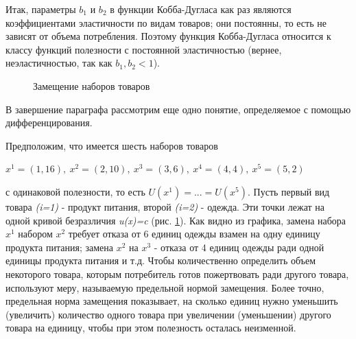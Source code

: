 \documentclass[12pt, 4paper]{book}
\begin{document}
{Итак, параметры $b_1$ и $b_2$ в функции Кобба-Дугласа как раз являются коэффициентами эластичности по видам товаров; они постоянны, то есть не зависят от объема потребления. Поэтому функция Кобба-Дугласа относится к классу функций полезности с постоянной эластичностью (вернее, неэластичностью, так как $b_{1},b_{2}<1$).

\begin{figure}[h]
	\caption{Замещение наборов товаров}
	\label{image2.3}
\end{figure}

\par
В завершение параграфа рассмотрим еще одно понятие, определяемое с помощью дифференцирования.

\par
Предположим, что имеется шесть наборов товаров 
\begin{center}
$x^1=(1,16), \: x^2=(2,10),\: x^3=(3,6),\: x^4=(4,4),\: x^5=(5,2)$
\end{center}
с одинаковой полезности, то есть $U(x^1)=...=U(x^5)$. Пусть первый вид товара \textit{(i=1)} - продукт питания, второй \textit{(i=2)} - одежда. Эти точки лежат на одной кривой безразличия \textit{u(x)=c} (рис. \ref{image2.3}). Как видно из графика, замена набора $x^1$ набором $x^2$ требует отказа от 6 единиц одежды взамен на одну единицу продукта питания; замена $x^2$ на $x^3$ - отказа от 4 единиц одежды ради одной единицы продукта питания и т.д. Чтобы количественно определить объем некоторого товара, которым потребитель готов пожертвовать ради другого товара, используют меру, называемую предельной нормой замещения. Более точно, предельная норма замещения показывает, на сколько единиц нужно уменьшить (увеличить) количество одного товара при увеличении (уменьшении) другого товара на единицу, чтобы при этом полезность осталась неизменной.
 
}
\end{document}
